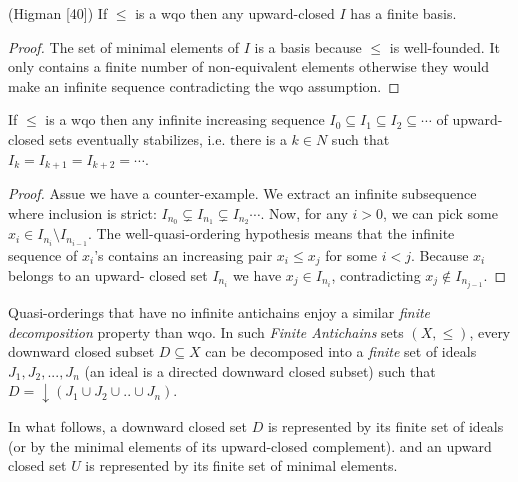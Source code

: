 \begin{lemma}{(Higman [40])} 
If $\leq$ is a wqo then any upward-closed $I$ has a
finite basis.
\end{lemma}


\begin{proof}
The set of minimal elements of $I$ is a basis because $\leq$ is well-founded. It
only contains a finite number of non-equivalent elements otherwise they would make
an infinite sequence contradicting the wqo assumption.
\end{proof}



\begin{lemma}  \label{upward-closed stablizes}
If $\leq$ is a wqo then any infinite increasing sequence $I_0 \subseteq I_1 \subseteq I_2 \subseteq \cdots$ of
upward-closed sets eventually stabilizes, i.e. there is a $k \in N$ such that 
$I_k = I_{k+1} = I_{k+2} = \cdots $.
\end{lemma}

\begin{proof}
Assue we have a counter-example.
We extract an infinite subsequence where
inclusion is strict: $I_{n_0} \subsetneq I_{n_1} \subsetneq I_{n_2} \cdots$. Now, for any $i>0$, we can pick some $x_i \in I_{n_i} \setminus I_{n_{i-1}}$. The well-quasi-ordering hypothesis means that the infinite sequence of $x_i$'s
contains an increasing pair $x_i \leq x_j$ for some $i<j$. Because $x_i$ belongs to an upward-
closed set $I_{n_i}$ we have $x_j \in I_{n_i} $, contradicting $x_j \not\in I_{n_{ j - 1}}$.
\end{proof}
%
\fi
%

Quasi-orderings that have no infinite antichains enjoy a similar \emph{finite decomposition} property than wqo. In such \emph{Finite Antichains} sets $(X,\leq)$, every downward closed subset $D \subseteq X$ can be decomposed into a \emph{finite} set of ideals $J_1, J_2,..., J_n$ (an ideal is a directed downward closed subset) such that $D = \downarrow (J_1 \cup J_2 \cup..\cup J_n)$.

In what follows, a downward closed set $D$ is represented by its finite set of ideals (or by the minimal elements of its upward-closed complement).
and an upward closed set $U$ is represented by its finite set of minimal elements. \\



